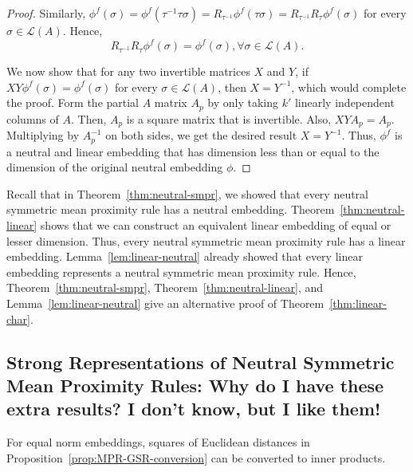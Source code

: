 \documentclass[10pt,letterpaper]{article}
\newcommand{\calL}{{\mathcal{L}}}
\newcommand{\rank}{{\calL(A)}}
\begin{document}
\begin{proof}
Similarly, $\phi^f(\sigma) = \phi^f(\tau^{-1} \tau \sigma) = R_{\tau^{-1}} \phi^f(\tau \sigma) = R_{\tau^{-1}} R_{\tau} \phi^f(\sigma)$ for every $\sigma \in \rank$. Hence, 
$$
R_{\tau^{-1}} R_{\tau} \phi^f(\sigma) = \phi^f(\sigma), \forall \sigma \in \rank.
$$

We now show that for any two invertible matrices $X$ and $Y$, if $X Y \phi^f(\sigma) = \phi^f(\sigma)$ for every $\sigma \in \rank$, then $X = Y^{-1}$, which would complete the proof. Form the partial $A$ matrix $A_p$ by only taking $k'$ linearly independent columns of $A$. Then, $A_p$ is a square matrix that is invertible. Also, $X Y A_p = A_p$. Multiplying by $A_p^{-1}$ on both sides, we get the desired result $X = Y^{-1}$. Thus, $\phi^f$ is a neutral and linear embedding that has dimension less than or equal to the dimension of the original neutral embedding $\phi$. 
\end{proof}

Recall that in Theorem~\ref{thm:neutral-smpr}, we showed that every neutral symmetric mean proximity rule has a neutral embedding. Theorem~\ref{thm:neutral-linear} shows that we can construct an equivalent linear embedding of equal or lesser dimension. Thus, every neutral symmetric mean proximity rule has a linear embedding. Lemma~\ref{lem:linear-neutral} already showed that every linear embedding represents a neutral symmetric mean proximity rule. Hence, Theorem~\ref{thm:neutral-smpr}, Theorem~\ref{thm:neutral-linear}, and Lemma~\ref{lem:linear-neutral} give an alternative proof of Theorem~\ref{thm:linear-char}.


\subsection{Strong Representations of Neutral Symmetric Mean Proximity Rules: Why do I have these extra results? I don't know, but I like them!}

For equal norm embeddings, squares of Euclidean distances in Proposition~\ref{prop:MPR-GSR-conversion} can be converted to inner products.
\end{document}
